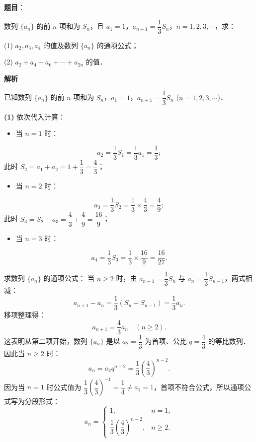 \begin{answer}

\textbf{题目}：

数列 $\{a_n\}$ 的前 $n$ 项和为 $S_n$，且 $a_1 = 1$，$a_{n+1} = \dfrac{1}{3}S_n$，$n = 1, 2, 3, \cdots$，求：

(1) $a_2, a_3, a_4$ 的值及数列 $\{a_n\}$ 的通项公式；

(2) $a_2 + a_4 + a_6 + \cdots + a_{2n}$ 的值．

\textbf{解析}

已知数列 $\{a_n\}$ 的前 $n$ 项和为 $S_n$，$a_1 = 1$，$a_{n+1} = \dfrac{1}{3}S_n$ ($n = 1, 2, 3, \cdots$)．

\textbf{(1)}
依次代入计算：
\begin{itemize}
\item 当 $n = 1$ 时：
\end{itemize}
\nopagebreak[4]
\[
a_2 = \frac{1}{3}S_1 = \frac{1}{3}a_1 = \frac{1}{3};
\]
  此时 $S_2 = a_1 + a_2 = 1 + \dfrac{1}{3} = \dfrac{4}{3}$；
\begin{itemize}
\item 当 $n = 2$ 时：
\end{itemize}
\nopagebreak[4]
\[
a_3 = \frac{1}{3}S_2 = \frac{1}{3} \times \frac{4}{3} = \frac{4}{9};
\]
  此时 $S_3 = S_2 + a_3 = \dfrac{4}{3} + \dfrac{4}{9} = \dfrac{16}{9}$；
\begin{itemize}
\item 当 $n = 3$ 时：
\end{itemize}
\nopagebreak[4]
\[
a_4 = \frac{1}{3}S_3 = \frac{1}{3} \times \frac{16}{9} = \frac{16}{27}.
\]

求数列 $\{a_n\}$ 的通项公式：
当 $n \geqslant 2$ 时，由 $a_{n+1} = \dfrac{1}{3}S_n$ 与 $a_n = \dfrac{1}{3}S_{n-1}$，两式相减：
\nopagebreak[4]
\[
a_{n+1} - a_n = \frac{1}{3}(S_n - S_{n-1}) = \frac{1}{3}a_n.
\]
移项整理得：
\nopagebreak[4]
\[
a_{n+1} = \frac{4}{3}a_n \quad (n \geqslant 2).
\]
这表明从第二项开始，数列 $\{a_n\}$ 是以 $a_2 = \dfrac{1}{3}$ 为首项、公比 $q = \dfrac{4}{3}$ 的等比数列．
因此当 $n \geqslant 2$ 时：
\nopagebreak[4]
\[
a_n = a_2 q^{n-2} = \frac{1}{3}\left(\frac{4}{3}\right)^{n-2}.
\]
因为当 $n = 1$ 时公式值为 $\dfrac{1}{3}\left(\dfrac{4}{3}\right)^{-1} = \dfrac{1}{4} \neq a_1 = 1$，首项不符合公式，所以通项公式写为分段形式：
\nopagebreak[4]
\[
a_n = \begin{cases}
1, & n = 1, \\
\dfrac{1}{3}\left(\dfrac{4}{3}\right)^{n-2}, & n \geqslant 2.
\end{cases}
\]


\end{answer}
